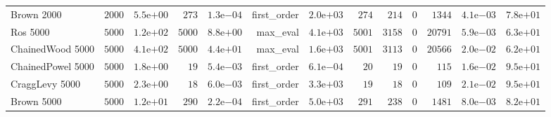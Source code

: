 \begin{longtable}[c]{lrrrrrrrrrrrr}
Brown 2000 & \( 2000\) & \( 5.5\)e\(+00\) & \(  273\) & \( 1.3\)e\(-04\) & first\_order & \( 2.0\)e\(+03\) & \(  274\) & \(  214\) & \(    0\) & \( 1344\) & \( 4.1\)e\(-03\) & \( 7.8\)e\(+01\) \\
Ros 5000 & \( 5000\) & \( 1.2\)e\(+02\) & \( 5000\) & \( 8.8\)e\(+00\) & max\_eval & \( 4.1\)e\(+03\) & \( 5001\) & \( 3158\) & \(    0\) & \(20791\) & \( 5.9\)e\(-03\) & \( 6.3\)e\(+01\) \\
ChainedWood 5000 & \( 5000\) & \( 4.1\)e\(+02\) & \( 5000\) & \( 4.4\)e\(+01\) & max\_eval & \( 1.6\)e\(+03\) & \( 5001\) & \( 3113\) & \(    0\) & \(20566\) & \( 2.0\)e\(-02\) & \( 6.2\)e\(+01\) \\
ChainedPowel 5000 & \( 5000\) & \( 1.8\)e\(+00\) & \(   19\) & \( 5.4\)e\(-03\) & first\_order & \( 6.1\)e\(-04\) & \(   20\) & \(   19\) & \(    0\) & \(  115\) & \( 1.6\)e\(-02\) & \( 9.5\)e\(+01\) \\
CraggLevy 5000 & \( 5000\) & \( 2.3\)e\(+00\) & \(   18\) & \( 6.0\)e\(-03\) & first\_order & \( 3.3\)e\(+03\) & \(   19\) & \(   18\) & \(    0\) & \(  109\) & \( 2.1\)e\(-02\) & \( 9.5\)e\(+01\) \\
Brown 5000 & \( 5000\) & \( 1.2\)e\(+01\) & \(  290\) & \( 2.2\)e\(-04\) & first\_order & \( 5.0\)e\(+03\) & \(  291\) & \(  238\) & \(    0\) & \( 1481\) & \( 8.0\)e\(-03\) & \( 8.2\)e\(+01\) \\
\hline 
\end{longtable}



